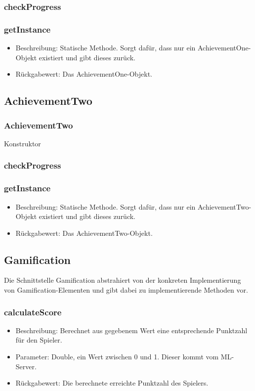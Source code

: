 \documentclass[a4paper]{scrreprt}
\begin{document}
   \subsubsection{checkProgress}
   \subsubsection{getInstance}
   \begin{itemize}
   \item Beschreibung: Statische Methode. Sorgt dafür, dass nur ein AchievementOne-Objekt existiert und gibt dieses zurück.
   \item Rückgabewert: Das AchievementOne-Objekt.
\end{itemize}
   
   \subsection{AchievementTwo}
   \subsubsection{AchievementTwo}
   Konstruktor
   \subsubsection{checkProgress}
   \subsubsection{getInstance}
   \begin{itemize}
   \item Beschreibung: Statische Methode. Sorgt dafür, dass nur ein AchievementTwo-Objekt existiert und gibt dieses zurück.
   \item Rückgabewert: Das AchievementTwo-Objekt.
\end{itemize}
   
      
   \subsection{Gamification}
   Die Schnittstelle Gamification abstrahiert von der konkreten Implementierung von Gamification-Elementen und gibt dabei zu implementierende Methoden vor.
   \subsubsection{calculateScore}
    \begin{itemize}
   	\item Beschreibung: Berechnet aus gegebenem Wert eine entsprechende Punktzahl für den Spieler.
   	\item Parameter: Double, ein Wert zwischen 0 und 1. Dieser kommt vom ML-Server.
   	\item Rückgabewert: Die berechnete erreichte Punktzahl des Spielers.
   \end{itemize}
\end{document}
